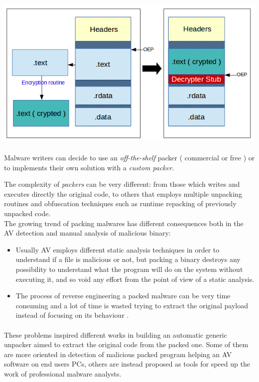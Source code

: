 \includegraphics[width=1.1\textwidth]{pictures/packer_general.png} \\\\

Malware writers can decide to use an \textit{off-the-shelf} packer ( commercial or free ) or to implements their own solution with a \textit{custom packer}.

The complexity of \textit{packers} can be very different: from those which writes and executes directly the original code, to others that employs multiple unpacking routines and obfuscation techniques such as runtime repacking of previously unpacked code.\\
The growing trend of packing malwares has different consequences both in the AV detection and manual analysis of malicious binary:
\begin{itemize}
\item Usually AV employs different static analysis techniques in order to understand if a file is malicious or not, but packing a binary destroys any possibility to understand what the program will do on the system without executing it, and so void any effort from the point of view of a static analysis.
\item The process of reverse engineering a packed malware can be very time consuming and a lot of time is wasted trying to extract the original payload instead of focusing on its behaviour .
\end{itemize}
\paragraph{}
These problems inspired different works in building an automatic generic unpacker aimed to extract the original code from the packed one. Some of them are more oriented in detection of malicious packed program helping an AV software on end users PCs, others are instead proposed as tools for speed up the work of professional malware analysts.
